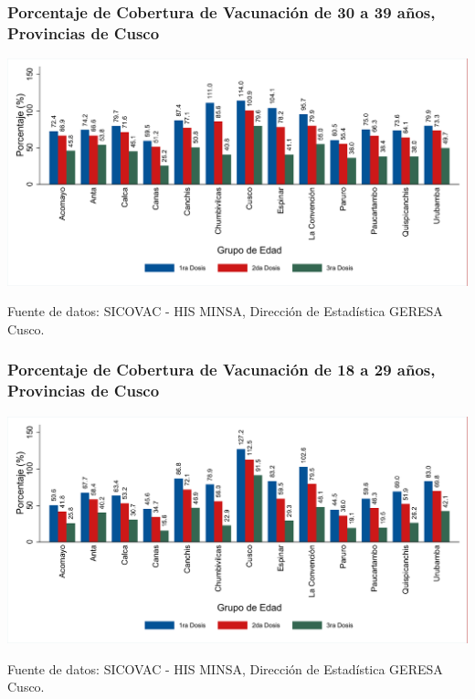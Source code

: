 \documentclass[xcolor=table]{beamer}
\begin{document}
\begin{frame}[label=vacunas_40]
	\frametitle{Porcentaje de Cobertura de Vacunación de 30 a 39 años, Provincias de Cusco}
	\vspace{-.5cm}
	\begin{center}
		\includegraphics[width=1.0\linewidth, trim={.2cm .5cm .2cm .2cm},clip]{../figuras/vacunacion_provincial_edad_practica_4.pdf}
	\end{center}
	{\tiny Fuente de datos: SICOVAC - HIS MINSA, Dirección de Estadística GERESA Cusco. \\}
\hyperlink{cobertura_vacuna_provincias}{}
\end{frame}

\begin{frame}[label=vacunas_30]
	\frametitle{Porcentaje de Cobertura de Vacunación de 18 a 29 años, Provincias de Cusco}
	\vspace{-.5cm}
	\begin{center}
		\includegraphics[width=1.0\linewidth, trim={.2cm .5cm .2cm .2cm},clip]{../figuras/vacunacion_provincial_edad_practica_3.pdf}
	\end{center}
	{\tiny Fuente de datos: SICOVAC - HIS MINSA, Dirección de Estadística GERESA Cusco. \\}
\hyperlink{cobertura_vacuna_provincias}{}
\end{frame}
\end{document}

